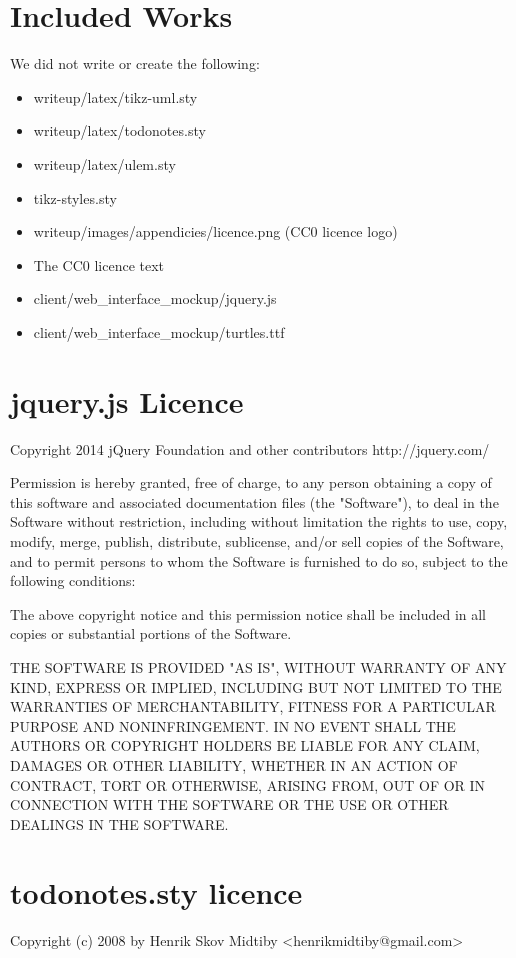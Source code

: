 \section{Included Works}
We did not write or create the following:
\begin{itemize}
\item writeup/latex/tikz-uml.sty
\item writeup/latex/todonotes.sty
\item writeup/latex/ulem.sty
\item tikz-styles.sty
\item writeup/images/appendicies/licence.png (CC0 licence logo)
\item The CC0 licence text
\item client/web\_interface\_mockup/jquery.js
\item client/web\_interface\_mockup/turtles.ttf
\end{itemize}

\section{jquery.js Licence}
Copyright 2014 jQuery Foundation and other contributors
http://jquery.com/

Permission is hereby granted, free of charge, to any person obtaining
a copy of this software and associated documentation files (the
"Software"), to deal in the Software without restriction, including
without limitation the rights to use, copy, modify, merge, publish,
distribute, sublicense, and/or sell copies of the Software, and to
permit persons to whom the Software is furnished to do so, subject to
the following conditions:

The above copyright notice and this permission notice shall be
included in all copies or substantial portions of the Software.

THE SOFTWARE IS PROVIDED "AS IS", WITHOUT WARRANTY OF ANY KIND,
EXPRESS OR IMPLIED, INCLUDING BUT NOT LIMITED TO THE WARRANTIES OF
MERCHANTABILITY, FITNESS FOR A PARTICULAR PURPOSE AND
NONINFRINGEMENT. IN NO EVENT SHALL THE AUTHORS OR COPYRIGHT HOLDERS BE
LIABLE FOR ANY CLAIM, DAMAGES OR OTHER LIABILITY, WHETHER IN AN ACTION
OF CONTRACT, TORT OR OTHERWISE, ARISING FROM, OUT OF OR IN CONNECTION
WITH THE SOFTWARE OR THE USE OR OTHER DEALINGS IN THE SOFTWARE.

\section{todonotes.sty licence}
Copyright (c) 2008 by Henrik Skov Midtiby <henrikmidtiby@gmail.com>

